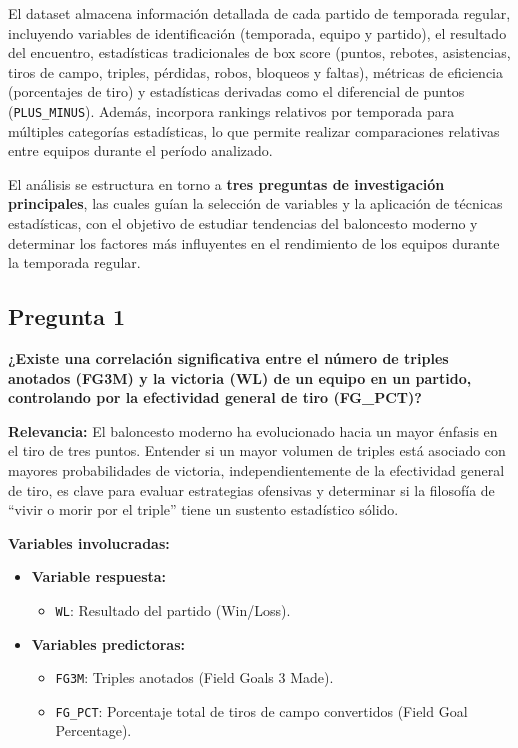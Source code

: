 \documentclass[12pt]{article}
\newcommand{\pregunta}[1]{\textbf{\large #1}}
\begin{document}
El dataset almacena información detallada de cada partido de temporada regular, incluyendo variables de identificación (temporada, equipo y partido), el resultado del encuentro, estadísticas tradicionales de box score (puntos, rebotes, asistencias, tiros de campo, triples, pérdidas, robos, bloqueos y faltas), métricas de eficiencia (porcentajes de tiro) y estadísticas derivadas como el diferencial de puntos (\texttt{PLUS\_MINUS}). Además, incorpora rankings relativos por temporada para múltiples categorías estadísticas, lo que permite realizar comparaciones relativas entre equipos durante el período analizado.

El análisis se estructura en torno a \textbf{tres preguntas de investigación principales}, las cuales guían la selección de variables y la aplicación de técnicas estadísticas, con el objetivo de estudiar tendencias del baloncesto moderno y determinar los factores más influyentes en el rendimiento de los equipos durante la temporada regular.

\subsection*{\pregunta{Pregunta 1}}

\textbf{¿Existe una correlación significativa entre el número de triples anotados (FG3M) y la victoria (WL) de un equipo en un partido, controlando por la efectividad general de tiro (FG\_PCT)?}

\vspace{0.3cm}

\textbf{Relevancia:}  
El baloncesto moderno ha evolucionado hacia un mayor énfasis en el tiro de tres puntos. Entender si un mayor volumen de triples está asociado con mayores probabilidades de victoria, independientemente de la efectividad general de tiro, es clave para evaluar estrategias ofensivas y determinar si la filosofía de ``vivir o morir por el triple'' tiene un sustento estadístico sólido.

\vspace{0.3cm}

\textbf{Variables involucradas:}
\begin{itemize}
    \setlength\itemsep{0.1em}
    \item \textbf{Variable respuesta:}
    \begin{itemize}
        \item \texttt{WL}: Resultado del partido (Win/Loss).
    \end{itemize}
    \item \textbf{Variables predictoras:}
    \begin{itemize}
        \item \texttt{FG3M}: Triples anotados (Field Goals 3 Made).
        \item \texttt{FG\_PCT}: Porcentaje total de tiros de campo convertidos (Field Goal Percentage).
    \end{itemize}
\end{itemize}
\end{document}
